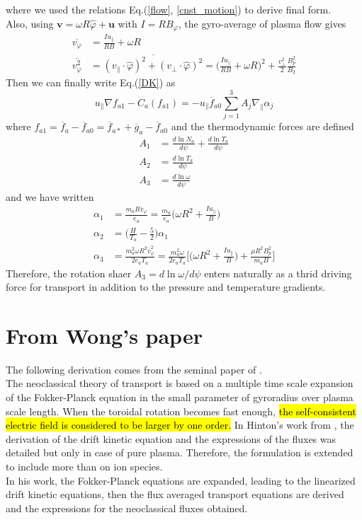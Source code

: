 where we used the relations Eq.(\ref{flow}, \ref{cnst_motion}) to derive final form. \\
Also, using $\bm{v}=\omega R \hat{\varphi} + \bm{u}$ with $I=RB_\varphi$, the gyro-average of plasma flow gives 
\begin{align}
    \overbar{v_\varphi} &= \frac{I u_\parallel}{RB} + \omega R \nonumber \\
    \overbar{v_\varphi^2} &= \overbar{(v_\parallel \cdot \hat{\varphi})^2 + (v_\perp \cdot \hat{\varphi})^2} = \Big(\frac{I u_\parallel}{RB}+\omega R \Big)^2 + \frac{v_\perp^2}{2}\frac{B_p^2}{B_2}
\end{align}
Then we can finally write Eq.(\ref{DK}) as 
\begin{equation}
    u_\parallel \nabla f_{a1} - C_a(f_{a1}) = -u_\parallel \overbar{f}_{a0}\sum_{j=1}^3 A_j \nabla_\parallel \alpha_j
\end{equation}
where $f_{a1}=\overbar{f}_a-\overbar{f}_{a0}=\overbar{f}_{a*}+\overbar{g}_a-\overbar{f}_{a0}$ and the thermodynamic forces are defined
\begin{align}
    A_1 &= \frac{d\ln{N_a}}{d\psi} + \frac{d\ln{T_a}}{d\psi} \\
    A_2 &= \frac{d\ln{T_a}}{d\psi} \\
    A_3 &= \frac{d\ln{\omega}}{d\psi}
\end{align}
and we have written
\begin{align}
    \alpha_1 &=\frac{m_a R \overbar{v}_\varphi}{e_a} = \frac{m_a}{e_a}\Big(\omega R^2 + \frac{I u_\parallel}{B}\Big) \\
    \alpha_2 &= \big (\frac{H}{T_a}-\frac{5}{2}\Big)\alpha_1 \\
    \alpha_3 &= \frac{m_a^2 \omega R^2 \overbar{v}_\varphi^2}{2e_aT_a} = \frac{m_a^2 \omega}{2 e_a T_a}\Bigg[\Big(\omega R^2 + \frac{I u_\parallel}{B}\Big) + \frac{\mu R^2 B_p^2}{m_a B}\Bigg]
\end{align}
Therefore, the rotation shaer $A_3=d\ln{\omega}/d\psi$ enters naturally as a thrid driving force for transport in addition to the pressure and temperature gradients.

\section{From Wong's paper}
The following derivation comes from the seminal paper of \citep{Wong87}. \\
The neoclassical theory of transport is based on a multiple time scale expansion of the Fokker-Planck equation in the small parameter of gyroradius over plasma scale length. When the toroidal rotation becomes fast enough, \hl{the self-consistent electric field is considered to be larger by one order.} In Hinton's work from \citep{Hinton85}, the derivation of the drift kinetic equation and the expressions of the fluxes was detailed but only in case of pure plasma. Therefore, the formulation is extended to include more than on ion species. \\
In his work, the Fokker-Planck equations are expanded, leading to the linearized drift kinetic equations, then the flux averaged transport equations are derived and the expressions for the neoclassical fluxes obtained. 
